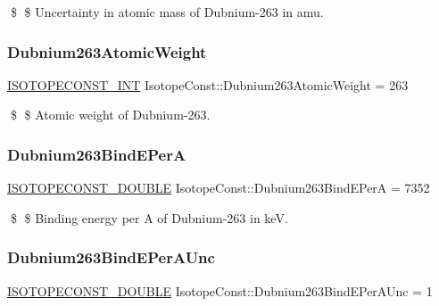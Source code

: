 \$ \$ Uncertainty in atomic mass of Dubnium-\/263 in amu. \mbox{\label{group___isotope_const-_dubnium-_db263_ga75419fcc2b14a2e9ebec110849b06ff1}} 
\subsubsection{\texorpdfstring{Dubnium263\+Atomic\+Weight}{Dubnium263AtomicWeight}}
{\footnotesize\ttfamily \mbox{\hyperlink{group___isotope_const-_macros_ga5f18360b3e99483a35c32d789e62621c}{I\+S\+O\+T\+O\+P\+E\+C\+O\+N\+S\+T\+\_\+\+I\+NT}} Isotope\+Const\+::\+Dubnium263\+Atomic\+Weight = 263}

\$ \$ Atomic weight of Dubnium-\/263. \mbox{\label{group___isotope_const-_dubnium-_db263_ga9b0cd1e4f8f995876cf5292b58af29a2}} 
\subsubsection{\texorpdfstring{Dubnium263\+Bind\+E\+PerA}{Dubnium263BindEPerA}}
{\footnotesize\ttfamily \mbox{\hyperlink{group___isotope_const-_macros_ga8f45a7272ce02c0b4c65c44636ed719a}{I\+S\+O\+T\+O\+P\+E\+C\+O\+N\+S\+T\+\_\+\+D\+O\+U\+B\+LE}} Isotope\+Const\+::\+Dubnium263\+Bind\+E\+PerA = 7352}

\$ \$ Binding energy per A of Dubnium-\/263 in keV. \mbox{\label{group___isotope_const-_dubnium-_db263_ga9e189ec228499e0f908d89642368b538}} 
\subsubsection{\texorpdfstring{Dubnium263\+Bind\+E\+Per\+A\+Unc}{Dubnium263BindEPerAUnc}}
{\footnotesize\ttfamily \mbox{\hyperlink{group___isotope_const-_macros_ga8f45a7272ce02c0b4c65c44636ed719a}{I\+S\+O\+T\+O\+P\+E\+C\+O\+N\+S\+T\+\_\+\+D\+O\+U\+B\+LE}} Isotope\+Const\+::\+Dubnium263\+Bind\+E\+Per\+A\+Unc = 1}

